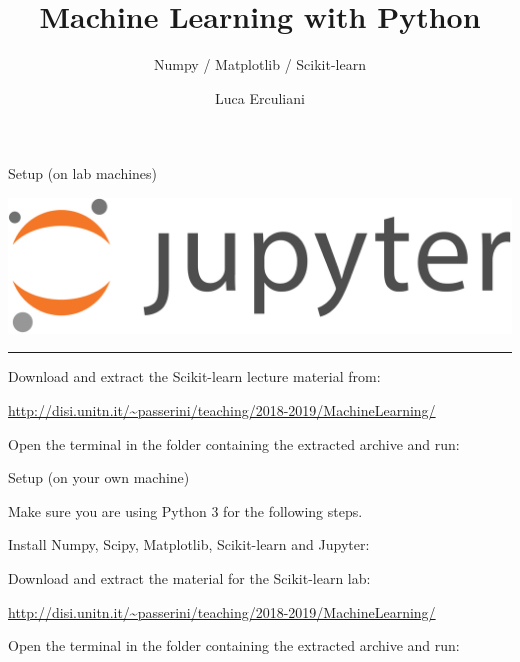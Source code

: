 \documentclass{beamer}
\title{Machine Learning with Python} %
\subtitle{Numpy / Matplotlib / Scikit-learn} %
\author{Luca Erculiani}
\begin{document}
  \frame{\maketitle}


\begin{frame}{Setup (on lab machines)}
\centering

\includegraphics[width=\textwidth]{figures/jupyter}

\vspace{0.3in}
\hrule
\vspace{0.3in}

Download and extract the Scikit-learn lecture material from:

{\footnotesize \url{http://disi.unitn.it/~passerini/teaching/2018-2019/MachineLearning/}}

Open the terminal in the folder containing the extracted archive and run:

\end{frame}


\begin{frame}{Setup (on your own machine)}
\centering

Make sure you are using Python 3 for the following steps.

\vspace{0.1in}

Install Numpy, Scipy, Matplotlib, Scikit-learn and Jupyter:



Download and extract the material for the Scikit-learn lab:

\vspace{0.2in}

{\footnotesize \url{http://disi.unitn.it/~passerini/teaching/2018-2019/MachineLearning/}}

Open the terminal in the folder containing the extracted archive and run:

\end{frame}
\end{document}
